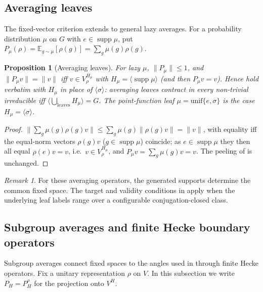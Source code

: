 \documentclass[11pt]{amsart}
\newtheorem{proposition}[proposition]{Proposition}
\theoremstyle{definition}
\theoremstyle{remark}
\newtheorem{remark}[remark]{Remark}
\theoremstyle{plain}
\theoremstyle{plain}
\numberwithin{equation}{section}
\newcommand{\norm}[1]{\lVert #1 \rVert}
\newcommand{\opn}[1]{\norm{#1}}
\begin{document}


\subsection{Averaging leaves}

The fixed-vector criterion extends to general lazy averages. For a
probability distribution $\mu$ on $G$ with $e\in\operatorname{supp}\mu$,
put $P_\mu(\rho)=\mathbb E_{g\sim\mu}[\rho(g)]=\sum_g\mu(g)\rho(g)$.

\begin{proposition}[Averaging leaves]
\label{prop:general-leaf}
For lazy $\mu$, $\opn{P_\mu}\le1$, and $\norm{P_\mu v}=\norm v$ iff $v\in V_\rho^{H_\mu}$ with
$H_\mu=\langle\operatorname{supp}\mu\rangle$ (and then $P_\mu v=v$). Hence
 hold verbatim with $H_\mu$ in place of $\langle\sigma\rangle$:
averaging leaves contract in every non-trivial irreducible iff
$\langle\bigcup_{\text{leaves}}H_\mu\rangle=G$. The point-function leaf
$\mu=\mathrm{unif}\{e,\sigma\}$ is the case $H_\mu=\langle\sigma\rangle$.
\end{proposition}
\begin{proof}
$\norm{\sum_g\mu(g)\rho(g)v}\le\sum_g\mu(g)\norm{\rho(g)v}=\norm v$, with equality iff the equal-norm
vectors $\rho(g)v$ ($g\in\operatorname{supp}\mu$) coincide; as $e\in\operatorname{supp}\mu$ they then
all equal $\rho(e)v=v$, i.e.\ $v\in V_\rho^{H_\mu}$, and $P_\mu v=\sum_g\mu(g)v=v$. The peeling of
 is unchanged.
\end{proof}

\begin{remark}
For these averaging operators, the generated supports determine the
common fixed space. The target and validity conditions in
 apply when the underlying leaf labels range over a
configurable conjugation-closed class.
\end{remark}

\subsection{Subgroup averages and finite Hecke boundary operators}
\label{subsec:hecke-boundary}

Subgroup averages connect fixed spaces to the angles used in
 through finite Hecke operators.
Fix a unitary representation $\rho$ on $V$. In this subsection we write
$P_H=P_H^\rho$ for the projection onto $V^H$.
\end{document}
